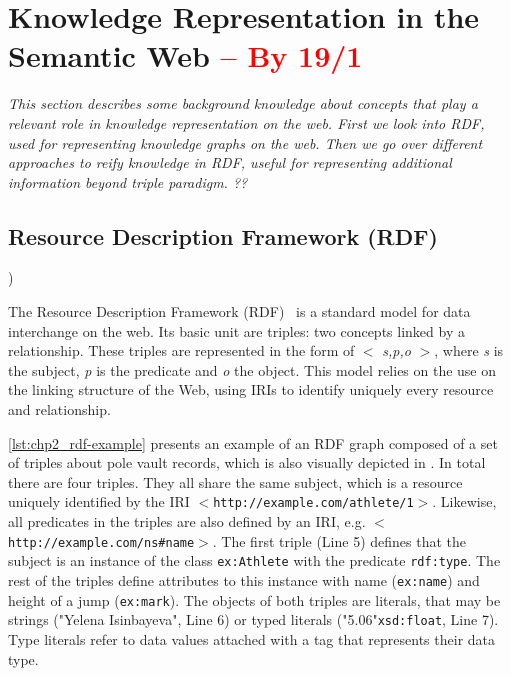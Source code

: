 \section{Knowledge Representation in the Semantic Web \textcolor{red}{-- By 19/1}}
\label{sec:chp2_semweb}

\textit{This section describes some background knowledge about concepts that play a relevant role in knowledge representation on the web. First we look into RDF, used for representing knowledge graphs on the web. Then we go over different approaches to reify knowledge in RDF, useful for representing additional information beyond triple paradigm. ??}

\subsection{Resource Description Framework (RDF)}

)

The Resource Description Framework (RDF)~\parencite{rdf} is a standard model for data interchange on the web. Its basic unit are triples: two concepts linked by a relationship. These triples are represented in the form of $<$ \textit{s,p,o} $>$, where \textit{s} is the subject, \textit{p} is the predicate and \textit{o} the object. This model relies on the use on the linking structure of the Web, using IRIs to identify uniquely every resource and relationship. 

\cref{lst:chp2_rdf-example} presents an example of an RDF graph composed of a set of triples about pole vault records, which is also visually depicted in . In total there are four triples. They all share the same subject, which is a resource uniquely identified by the IRI $<$\texttt{http://example.com/athlete/1}$>$. Likewise, all predicates in the triples are also defined by an IRI, e.g. $<$\texttt{http://example.com/ns\#name}$>$. The first triple (Line 5) defines that the subject is an instance of the class \texttt{ex:Athlete} with the predicate \texttt{rdf:type}. The rest of the triples define attributes to this instance with name (\texttt{ex:name}) and height of a jump (\texttt{ex:mark}). The objects of both triples are literals, that may be strings ("Yelena Isinbayeva", Line 6) or typed literals ("5.06"\scalebox{.8}{\textsuperscript{$\wedge\wedge$}}\texttt{xsd:float}, Line 7). Type literals refer to data values attached with a tag that represents their data type.

